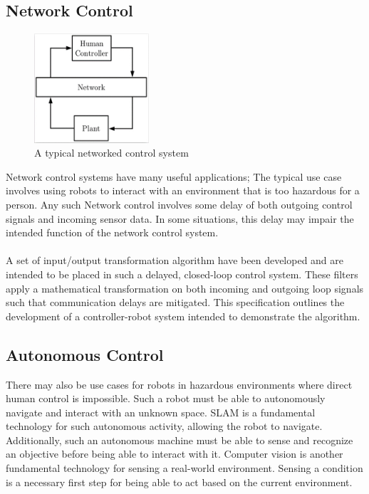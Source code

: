 \documentclass[english,12pt]{article}
\begin{document}
\subsection{Network Control}
\begin{figure}
    \begin{center}
      \includegraphics[width=0.38\textwidth]{typ_cs.jpg}
    \end{center}
    \caption{A typical networked control system}
  \end{figure}
Network control systems have many useful applications; The typical use case involves using robots to
interact with an environment that is too hazardous for a person. Any such Network control involves
some delay of both outgoing control signals and incoming sensor data. In some situations, this delay
may impair the intended function of the network control system.\\\\
A set of input/output transformation algorithm have been developed and are
 intended to be placed in such a delayed, closed-loop control
system. These filters apply a mathematical transformation on both incoming and outgoing loop signals
such that communication delays are mitigated. This specification outlines the development of a
controller-robot system intended to demonstrate the algorithm.
\subsection{Autonomous Control}
There may also be use cases for robots in hazardous environments where direct human control is
impossible. Such a robot must be able to autonomously navigate and interact with an unknown space.
SLAM is a fundamental technology for such autonomous activity, allowing the robot to navigate.
Additionally, such an autonomous machine must be able to sense and recognize an objective before
being able to interact with it. Computer vision is another
fundamental technology for sensing a real-world environment.
Sensing a condition is a necessary first step for being able to act
based on the current environment.
\end{document}
